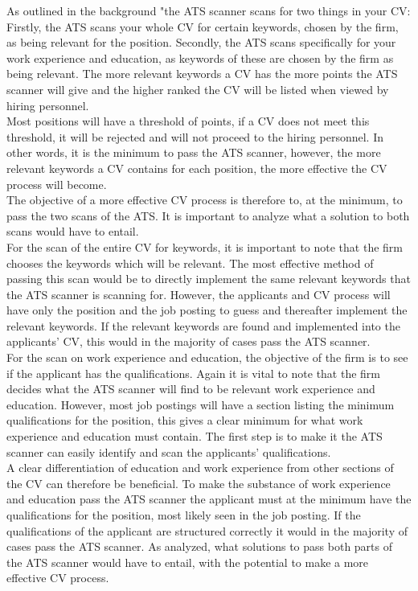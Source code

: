 As outlined in the background "the ATS scanner scans for two things in your CV:
Firstly, the ATS scans your whole CV for certain keywords, chosen by the firm, as being relevant for the position.
Secondly, the ATS scans specifically for your work experience and education, 
as keywords of these are chosen by the firm as being relevant. 
The more relevant keywords a CV has the more points the ATS scanner will give and the higher ranked the CV will be listed when viewed by hiring personnel. \\

Most positions will have a threshold of points, if a CV does not meet this threshold, 
it will be rejected and will not proceed to the hiring personnel.
In other words, it is the minimum to pass the ATS scanner, however, the more relevant keywords a CV contains for each position, 
the more effective the CV process will become. \\

The objective of a more effective CV process is therefore to, at the minimum, to pass the two scans of the ATS.
It is important to analyze what a solution to both scans would have to entail. \\
For the scan of the entire CV for keywords, it is important to note that the firm chooses the keywords which will be relevant.
The most effective method of passing this scan would be to directly implement the same relevant keywords that the ATS scanner is scanning for.
However, the applicants and CV process will have only the position and the job posting to guess and thereafter implement the relevant keywords.
If the relevant keywords are found and implemented into the applicants' CV, this would in the majority of cases pass the ATS scanner. \\

For the scan on work experience and education, the objective of the firm is to see if the applicant has the qualifications.
Again it is vital to note that the firm decides what the ATS scanner will find to be relevant work experience and education.
However, most job postings will have a section listing the minimum qualifications for the position, this gives a clear minimum for what work experience and education must contain.
The first step is to make it the ATS scanner can easily identify and scan the applicants' qualifications. \\

A clear differentiation of education and work experience from other sections of the CV can therefore be beneficial.
To make the substance of work experience and education pass the ATS scanner the applicant must at the minimum have the qualifications for the position, most likely seen in the job posting.
If the qualifications of the applicant are structured correctly it would in the majority of cases pass the ATS scanner.
As analyzed, what solutions to pass both parts of the ATS scanner would have to entail, with the potential to make a more effective CV process. \\
